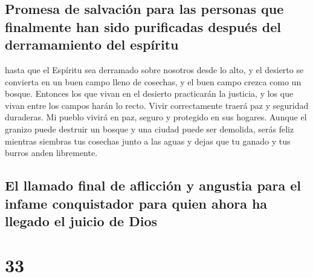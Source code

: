 \hypertarget{promesa-de-salvaciuxf3n-para-las-personas-que-finalmente-han-sido-purificadas-despuuxe9s-del-derramamiento-del-espuxedritu}{%
\subsection{Promesa de salvación para las personas que finalmente han
sido purificadas después del derramamiento del
espíritu}\label{promesa-de-salvaciuxf3n-para-las-personas-que-finalmente-han-sido-purificadas-despuuxe9s-del-derramamiento-del-espuxedritu}}

 hasta que el Espíritu sea derramado sobre nosotros desde
lo alto, y el desierto se convierta en un buen campo lleno de cosechas,
y el buen campo crezca como un bosque.  Entonces los que
vivan en el desierto practicarán la justicia, y los que vivan entre los
campos harán lo recto.  Vivir correctamente traerá paz y
seguridad duraderas.  Mi pueblo vivirá en paz, seguro y
protegido en sus hogares.  Aunque el granizo puede
destruir un bosque y una ciudad puede ser demolida, 
serás feliz mientras siembras tus cosechas junto a las aguas y dejas que
tu ganado y tus burros anden libremente.

\hypertarget{el-llamado-final-de-aflicciuxf3n-y-angustia-para-el-infame-conquistador-para-quien-ahora-ha-llegado-el-juicio-de-dios}{%
\subsection{El llamado final de aflicción y angustia para el infame
conquistador para quien ahora ha llegado el juicio de
Dios}\label{el-llamado-final-de-aflicciuxf3n-y-angustia-para-el-infame-conquistador-para-quien-ahora-ha-llegado-el-juicio-de-dios}}

\hypertarget{section-32}{%
\section{33}\label{section-32}}

